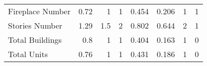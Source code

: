\begin{tabular}{lrrrrrrr}
 Fireplace Number               &      0.72     &      1        &      1        &      0.454    &      0.206    &      1        &      1        \\
 Stories Number                 &      1.29     &      1.5      &      2        &      0.802    &      0.644    &      2        &      1        \\
 Total Buildings                &      0.8      &      1        &      1        &      0.404    &      0.163    &      1        &      0        \\
 Total Units                    &      0.76     &      1        &      1        &      0.431    &      0.186    &      1        &      0        \\
\hline
\end{tabular}